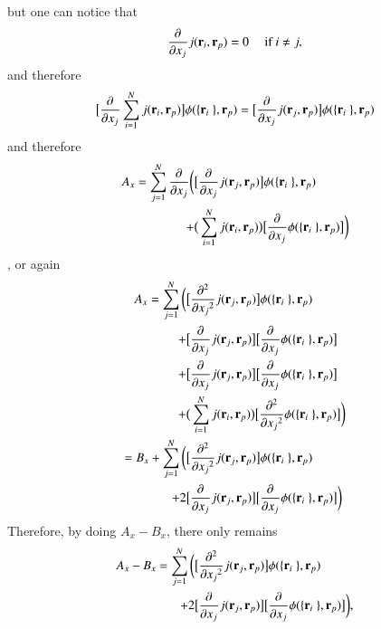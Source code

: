 \documentclass[aip,jcp,reprint,noshowkeys,superscriptaddress]{revtex4-1}
\newcommand{\deriv}[3]{\frac{\partial^{#3} #1}{\partial {#2}^{#3}}}
\newcommand{\bri}[1]{{\bf r}_{#1}}
\begin{document}
but one can notice that 
\begin{equation}
 \deriv{}{x_j}{} j(\bri{i},\bri{p}) = 0\quad \text{ if }i\ne j, 
\end{equation}
and therefore 
\begin{equation}
 \big[\deriv{}{x_j}{}\sum_{i=1}^Nj(\bri{i},\bri{p})\big] \phi(\{ \bri{i} \},\bri{p}) = 
 \big[\deriv{}{x_j}{}j(\bri{j},\bri{p})\big] \phi(\{ \bri{i} \},\bri{p})
\end{equation}
and therefore 
\begin{equation}
 \begin{aligned}
 A_x = \sum_{j=1}^{N} \deriv{}{x_j}{} \bigg( & \big[\deriv{}{x_j}{}j(\bri{j},\bri{p})\big] \phi(\{ \bri{i} \},\bri{p}) \\
                                            + &\big(\sum_{i=1}^Nj(\bri{i},\bri{p})\big) \big[\deriv{}{x_j}{} \phi(\{ \bri{i} \},\bri{p}) \big]\bigg)
 \end{aligned}
\end{equation},
or again 
\begin{equation}
 \begin{aligned}
 A_x = \sum_{j=1}^{N} \bigg( & \big[\deriv{}{x_j}{2}j(\bri{j},\bri{p})\big] \phi(\{ \bri{i} \},\bri{p}) \\ 
                                            +& \big[\deriv{}{x_j}{}j(\bri{j},\bri{p})\big] \big[ \deriv{}{x_j}{}\phi(\{ \bri{i} \},\bri{p}) \big]\\
                                            + &\big[\deriv{}{x_j}{}j(\bri{j},\bri{p})\big] \big[\deriv{}{x_j}{} \phi(\{ \bri{i} \},\bri{p}) \big] \\
                                            + & \big(\sum_{i=1}^Nj(\bri{i},\bri{p})\big) \big[\deriv{}{x_j}{2} \phi(\{ \bri{i} \},\bri{p})\big] \bigg)\\
          = B_x + \sum_{j=1}^{N} \bigg( &\big[\deriv{}{x_j}{2}j(\bri{j},\bri{p})\big] \phi(\{ \bri{i} \},\bri{p}) \\ 
                                + 2&\big[\deriv{}{x_j}{}j(\bri{j},\bri{p})\big] \big[\deriv{}{x_j}{} \phi(\{ \bri{i} \},\bri{p}) \big]\bigg) \\ 
 \end{aligned}
\end{equation}
Therefore, by doing $A_x-B_x$, there only remains 
\begin{equation}
 \begin{aligned}
 A_x - B_x = \sum_{j=1}^{N} \bigg( &\big[\deriv{}{x_j}{2}j(\bri{j},\bri{p})\big] \phi(\{ \bri{i} \},\bri{p}) \\ 
                                + 2&\big[\deriv{}{x_j}{}j(\bri{j},\bri{p})\big] \big[\deriv{}{x_j}{} \phi(\{ \bri{i} \},\bri{p}) \big]\bigg), \\ 
 \end{aligned}
\end{equation}
\end{document}
